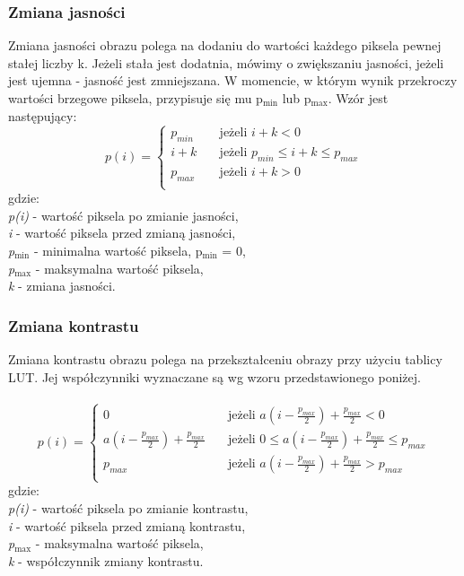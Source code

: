 \documentclass{classrep}
\begin{document}
\subsubsection{Zmiana jasności}
Zmiana jasności obrazu polega na dodaniu do wartości każdego piksela pewnej stałej liczby k. Jeżeli stała jest dodatnia, mówimy o zwiększaniu jasności, jeżeli jest ujemna - jasność jest zmniejszana. W momencie, w którym wynik przekroczy wartości brzegowe piksela, przypisuje się mu p$_{\text{min}}$ lub p$_{\text{max}}$. Wzór jest następujący:
\[ p(i) =
  \begin{cases}
    p_{min} & \quad \text{jeżeli } i + k < 0\\
    i + k  & \quad \text{jeżeli } p_{min} \leq i+k \leq p_{max}\\
    p_{max}  & \quad \text{jeżeli } i + k > 0\\
  \end{cases}
\]
gdzie:\\
\textit{p(i)} - wartość piksela po zmianie jasności,\\
\textit{i} - wartość piksela przed zmianą jasności,\\
\textit{p$_{\text{min}}$} - minimalna wartość piksela, p$_{\text{min}}$ = 0,\\
\textit{p$_{\text{max}}$} - maksymalna wartość piksela,\\
\textit{k} - zmiana jasności.\\

\subsubsection{Zmiana kontrastu}
Zmiana kontrastu obrazu polega na przekształceniu obrazy przy użyciu tablicy LUT. Jej współczynniki wyznaczane są wg wzoru przedstawionego poniżej.\\
\\
\[ p(i) =
  \begin{cases}
    0  & \quad \text{jeżeli } a(i - \frac{p_{max}}{2}) + \frac{p_{max}}{2} < 0\\
    a(i - \frac{p_{max}}{2}) + \frac{p_{max}}{2}   & \quad \text{jeżeli } 0 \leq a(i - \frac{p_{max}}{2}) + \frac{p_{max}}{2}  \leq p_{max}\\
    p_{max}  & \quad \text{jeżeli } a(i - \frac{p_{max}}{2}) + \frac{p_{max}}{2} > p_{max}\\
  \end{cases}
\]
gdzie:\\
\textit{p(i)} - wartość piksela po zmianie kontrastu,\\
\textit{i} - wartość piksela przed zmianą kontrastu,\\
\textit{p$_{\text{max}}$} - maksymalna wartość piksela,\\
\textit{k} - współczynnik zmiany kontrastu.\\
\end{document}
